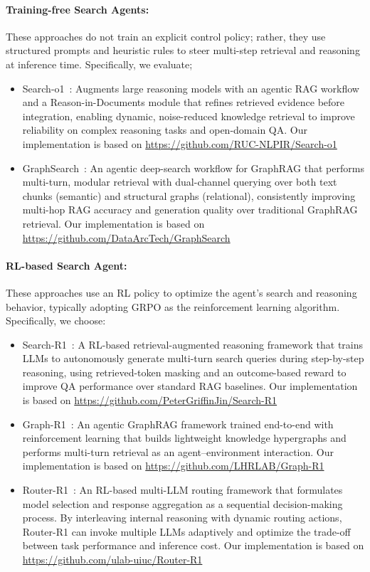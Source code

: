 \paragraph{\textbf{Training-free Search Agents:}}
These approaches do not train an explicit control policy; rather, they use structured prompts and heuristic rules to steer multi-step retrieval and reasoning at inference time. Specifically, we evaluate;
\begin{itemize}
    \item Search-o1~\cite{Search-o1}: Augments large reasoning models with an agentic RAG workflow and a Reason-in-Documents module that refines retrieved evidence before integration, enabling dynamic, noise-reduced knowledge retrieval to improve reliability on complex reasoning tasks and open-domain QA. Our implementation is based on \url{https://github.com/RUC-NLPIR/Search-o1}
    \item GraphSearch~\cite{GraphSearch}: An agentic deep-search workflow for GraphRAG that performs multi-turn, modular retrieval with dual-channel querying over both text chunks (semantic) and structural graphs (relational), consistently improving multi-hop RAG accuracy and generation quality over traditional GraphRAG retrieval. Our implementation is based on \url{https://github.com/DataArcTech/GraphSearch}
\end{itemize}
\paragraph{\textbf{RL-based Search Agent:}}
These approaches use an RL policy to optimize the agent’s search and reasoning behavior, typically adopting GRPO as the reinforcement learning algorithm. Specifically, we choose:
\begin{itemize}
    \item Search-R1~\cite{Search-R1}: A RL-based retrieval-augmented reasoning framework that trains LLMs to autonomously generate multi-turn search queries during step-by-step reasoning, using retrieved-token masking and an outcome-based reward to improve QA performance over standard RAG baselines. Our implementation is based on \url{https://github.com/PeterGriffinJin/Search-R1}
    \item Graph-R1~\cite{Graph-R1}: An agentic GraphRAG framework trained end-to-end with reinforcement learning that builds lightweight knowledge hypergraphs and performs multi-turn retrieval as an agent–environment interaction. Our implementation is based on \url{https://github.com/LHRLAB/Graph-R1}
    \item Router-R1~\cite{Router-R1}: An RL-based multi-LLM routing framework that formulates model selection and response aggregation as a sequential decision-making process. By interleaving internal reasoning with dynamic routing actions, Router-R1 can invoke multiple LLMs adaptively and optimize the trade-off between task performance and inference cost. Our implementation is based on \url{https://github.com/ulab-uiuc/Router-R1}
\end{itemize}


